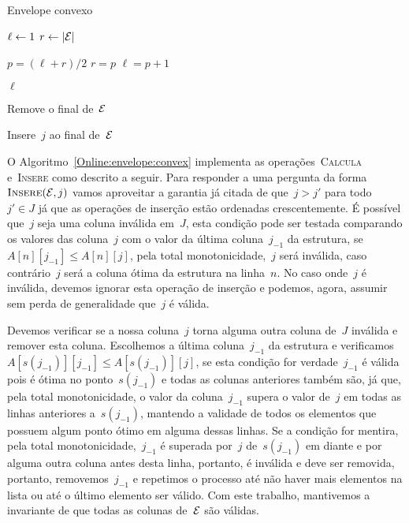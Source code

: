 \begin{algorithm}[h]
\caption{Envelope convexo}
\label{Online:envelope:convex}
\begin{algorithmic}[1]
    \State $\ell \leftarrow 1$
    \State $r \leftarrow |\mathcal{E}|$
    
        \State $p = (\ell+r)/2$
            \State $r = p$
        \Else
            \State $\ell = p+1$
        \EndIf
    \EndWhile

    \State \Return $\ell$
\EndFunction

        \State \Return
    \EndIf
    
        \State Remove o final de~$\mathcal{E}$
    \EndWhile

    \State Insere~$j$ ao final de~$\mathcal{E}$
\EndFunction
\end{algorithmic}
\end{algorithm}

O Algoritmo~\ref{Online:envelope:convex} implementa as operações~\textsc{Calcula} e~\textsc{Insere} como descrito a seguir. Para responder a uma pergunta da forma~$\textsc{Insere}(\mathcal{E},j)$ vamos aproveitar a garantia já citada de que~$j > j'$ para todo~$j' \in J$ já que as operações de inserção estão ordenadas crescentemente. É possível que~$j$ seja uma coluna inválida em~$J$, esta condição pode ser testada comparando os valores das coluna~$j$ com o valor da última coluna~$j_{-1}$ da estrutura, se~${A[n][j_{-1}] \leq A[n][j]}$, pela total monotonicidade,~$j$ será inválida, caso contrário~$j$ será a coluna ótima da estrutura na linha~$n$. No caso onde~$j$ é inválida, devemos ignorar esta operação de inserção e podemos, agora, assumir sem perda de generalidade que~$j$ é válida.

Devemos verificar se a nossa coluna~$j$ torna alguma outra coluna de~$J$ inválida e remover esta coluna. Escolhemos a última coluna~$j_{-1}$ da estrutura e verificamos~${A[s(j_{-1})][j_{-1}] \leq A[s(j_{-1})][j]}$, se esta condição for verdade~$j_{-1}$ é válida pois é ótima no ponto~$s(j_{-1})$ e todas as colunas anteriores também são, já que, pela total monotonicidade, o valor da coluna~$j_{-1}$ supera o valor de~$j$ em todas as linhas anteriores a~$s(j_{-1})$, mantendo a validade de todos os elementos que possuem algum ponto ótimo em alguma dessas linhas. Se a condição for mentira, pela total monotonicidade,~$j_{-1}$ é superada por~$j$ de~$s(j_{-1})$ em diante e por alguma outra coluna antes desta linha, portanto, é inválida e deve ser removida, portanto, removemos~$j_{-1}$ e repetimos o processo até não haver mais elementos na lista ou até o último elemento ser válido. Com este trabalho, mantivemos a invariante de que todas as colunas de~$\mathcal{E}$ são válidas.

